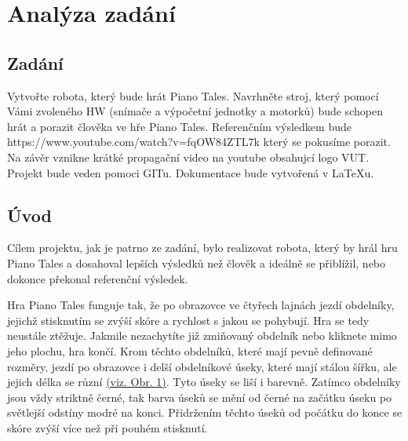 \documentclass[12pt,oneside]{book} %
\begin{document}
	


\tableofcontents

\chapter{Analýza zadání}\label{analyza-zadani}
\section{Zadání}
\qquad Vytvořte robota, který bude hrát Piano Tales. Navrhněte stroj, který pomocí Vámi zvoleného HW (snímače a výpočetní jednotky a motorků) bude schopen hrát a porazit člověka ve hře Piano Tales. Referenčním výsledkem bude https://www.youtube.com/watch?v=fqOW84ZTL7k který se pokusíme porazit. Na závěr vznikne krátké propagační video na youtube obsahujcí logo VUT.
Projekt bude veden pomoci GITu. Dokumentace bude vytvořená v LaTeXu. 
\section{Úvod}\label{uvod}
\qquad Cílem projektu, jak je patrno ze zadání, bylo realizovat robota, který by hrál hru Piano Tales a dosahoval lepších výsledků než člověk a ideálně se přiblížil, nebo dokonce překonal referenční výsledek.

\qquad Hra Piano Tales funguje tak, že po obrazovce ve čtyřech lajnách jezdí obdelníky, jejichž stisknutím se zvýší skóre a rychlost s jakou se pohybují. Hra se tedy neustále ztěžuje. Jakmile nezachytíte již zmiňovaný obdelník nebo kliknete mimo jeho plochu, hra končí. Krom těchto obdelníků, které mají pevně definované rozměry, jezdí po obrazovce i delší obdelníkové úseky, které mají stálou šířku, ale jejich délka se různí \hyperref[pianotales]{(viz. Obr. 1)}. Tyto úseky se liší i barevně. Zatímco obdelníky jsou vždy striktně černé, tak barva úseků se mění od černé na začátku úseku po světlejší odstíny modré na konci. Přidržením těchto úseků od počátku do konce se skóre zvýší více než při pouhém stisknutí. 
\end{document}
